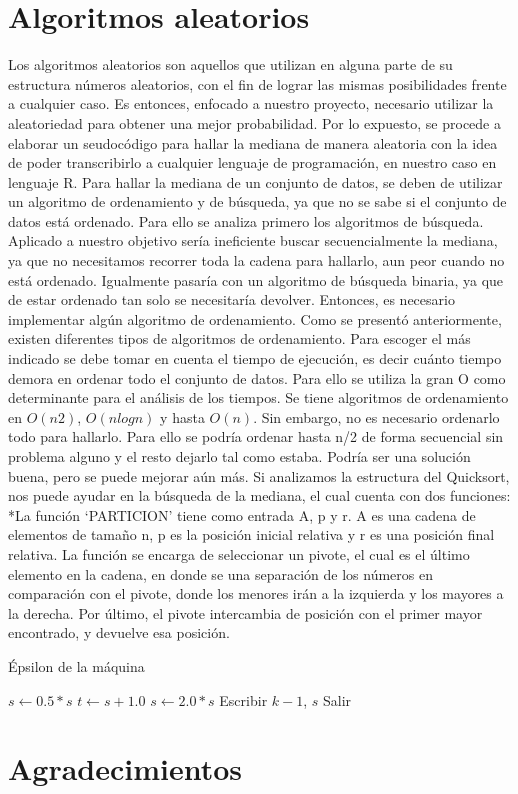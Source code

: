 \documentclass[9pt,draft,a4paper,twoside,onecolumn,romanappendices]{IEEEtran}\usepackage[]{graphicx}\usepackage[]{color}
\theoremstyle{definition}
\begin{document}
\section{Algoritmos aleatorios}
Los algoritmos aleatorios son aquellos que utilizan en alguna parte de su estructura números aleatorios, con el fin de lograr las mismas posibilidades frente a cualquier caso. Es entonces, enfocado a nuestro proyecto, necesario utilizar la aleatoriedad para obtener una mejor probabilidad. Por lo expuesto, se procede a elaborar un seudocódigo para hallar la mediana de manera aleatoria con la idea de poder transcribirlo a cualquier lenguaje de programación, en nuestro caso en lenguaje R. Para hallar la mediana de un conjunto de datos, se deben de utilizar un algoritmo de ordenamiento y de búsqueda, ya que no se sabe si el conjunto de datos está ordenado. Para ello se analiza primero los algoritmos de búsqueda. Aplicado a nuestro objetivo sería ineficiente buscar secuencialmente la mediana, ya que no necesitamos recorrer toda la cadena para hallarlo, aun peor cuando no está ordenado. Igualmente pasaría con un algoritmo de búsqueda binaria, ya que de estar ordenado tan solo se necesitaría devolver. Entonces, es necesario implementar algún algoritmo de ordenamiento.
Como se presentó anteriormente, existen diferentes tipos de algoritmos de ordenamiento. Para escoger el más indicado se debe tomar en cuenta el tiempo de ejecución, es decir cuánto tiempo demora en ordenar todo el conjunto de datos. Para ello se utiliza la gran O como determinante para el análisis de los tiempos. Se tiene algoritmos de ordenamiento en $O(n2)$, $O(nlogn)$ y hasta $O(n)$. 
Sin embargo, no es necesario ordenarlo todo para hallarlo. Para ello se podría ordenar hasta n/2 de forma secuencial sin problema alguno y el resto dejarlo tal como estaba. Podría ser una solución buena, pero se puede mejorar aún más. Si analizamos la estructura del Quicksort, nos puede ayudar en la búsqueda de la mediana, el cual cuenta con dos funciones:
*La función ‘PARTICION’ tiene como entrada A, p y r. A es una cadena de elementos de tamaño n, p es la posición inicial relativa y r es una posición final relativa. La función se encarga de seleccionar un pivote, el cual es el último elemento en la cadena, en donde se una separación de los números en comparación con el pivote, donde los menores irán a la izquierda y los mayores a la derecha. Por último, el pivote intercambia de posición con el primer mayor encontrado, y devuelve esa posición.

\begin{algorithm}[ht]
	\caption{Épsilon de la máquina}
	\begin{algorithmic}[1]
		\State $s \gets  0.5*s$
		\State $t \gets s+1.0$
		\State $s \gets 2.0*s$
		\State Escribir $k-1$, $s$
		\State Salir
		\EndIf
		\EndFor
	\end{algorithmic}
\end{algorithm}

\section{Agradecimientos}
\end{document}
